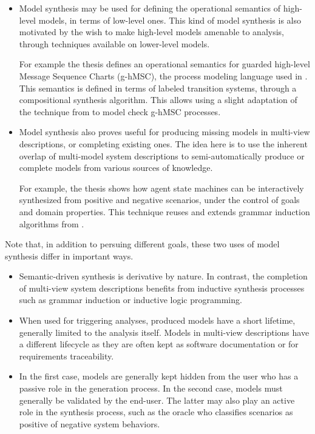 \begin{itemize}

\item Model synthesis may be used for defining the operational semantics of high-level models, in terms of low-level ones. This kind of model synthesis is also motivated by the wish to make high-level models amenable to analysis, through techniques available on lower-level models.

For example the thesis defines an operational semantics for guarded high-level Message Sequence Charts (g-hMSC), the process modeling language used in \cite{Damas:2011}. This semantics is defined in terms of labeled transition systems, through a compositional synthesis algorithm. This allows using a slight adaptation of the technique from \cite{Giannakopoulou:2003} to model check g-hMSC processes.

\item Model synthesis also proves useful for producing missing models in multi-view descriptions, or completing existing ones. The idea here is to use the inherent overlap of multi-model system descriptions to semi-automatically produce or complete models from various sources of knowledge.

For example, the thesis shows how agent state machines can be interactively synthesized from positive and negative scenarios, under the control of goals and domain properties. This technique reuses and extends grammar induction algorithms from \cite{Oncina:1992, Lang:1998}.

\end{itemize}

Note that, in addition to persuing different goals, these two uses of model synthesis differ in important ways.

\begin{itemize}

\item Semantic-driven synthesis is derivative by nature. In contrast, the completion of multi-view system descriptions benefits from inductive synthesis processes such as grammar induction or inductive logic programming.

\item When used for triggering analyses, produced models have a short lifetime, generally limited to the analysis itself. Models in multi-view descriptions have a different lifecycle as they are often kept as software documentation or for requirements traceability. 

\item In the first case, models are generally kept hidden from the user who has a passive role in the generation process. In the second case, models must generally be validated by the end-user. The latter may also play an active role in the synthesis process, such as the oracle who classifies scenarios as positive of negative system behaviors.

\end{itemize}

